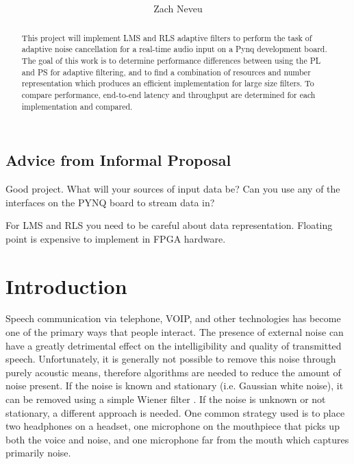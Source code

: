 \documentclass[12pt, letter]{article}
\author{Zach Neveu}
\title{  }
\begin{document}
\maketitle

\begin{abstract}
\noindent This project will implement \ac{LMS} and \ac{RLS} adaptive filters to perform the task of adaptive noise cancellation for a real-time audio input on a Pynq development board. The goal of this work is to determine performance differences between using the \ac{PL} and \ac{PS} for adaptive filtering, and to find a combination of resources and number representation which produces an efficient implementation for large size filters. To compare performance, end-to-end latency and throughput are determined for each implementation and compared.
\end{abstract}

\subsection*{Advice from Informal Proposal}
Good project.  What will your sources of input data be?  Can you use any of the interfaces on the PYNQ board to stream data in?

For \ac{LMS} and \ac{RLS} you need to be careful about data representation.  Floating point is expensive to implement in FPGA hardware.

\section{Introduction}%
\label{sec:system}
Speech communication via telephone, VOIP, and other technologies has become one of the primary ways that people interact. The presence of external noise can have a greatly detrimental effect on the intelligibility and quality of transmitted speech. Unfortunately, it is generally not possible to remove this noise through purely acoustic means, therefore algorithms are needed to reduce the amount of noise present. If the noise is known and stationary (i.e. Gaussian white noise), it can be removed using a simple Wiener filter \cite{wiener_extrapolation_1964}. If the noise is unknown or not stationary, a different approach is needed. One common strategy used is to place two headphones on a headset, one microphone on the mouthpiece that picks up both the voice and noise, and one microphone far from the mouth which captures primarily noise.




\end{document}
